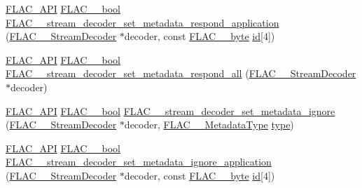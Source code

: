 \begin{DoxyCompactItemize}
\item 
\mbox{\hyperlink{group__flac__export_ga56ca07df8a23310707732b1c0007d6f5}{F\+L\+A\+C\+\_\+\+A\+PI}} \mbox{\hyperlink{ordinals_8h_a95103469f1cbd78b8cf250194985b34e}{F\+L\+A\+C\+\_\+\+\_\+bool}} \mbox{\hyperlink{group__flac__stream__decoder_gabf2a1e945eb2a158090665e03ff55ad2}{F\+L\+A\+C\+\_\+\+\_\+stream\+\_\+decoder\+\_\+set\+\_\+metadata\+\_\+respond\+\_\+application}} (\mbox{\hyperlink{struct_f_l_a_c_____stream_decoder}{F\+L\+A\+C\+\_\+\+\_\+\+Stream\+Decoder}} $\ast$decoder, const \mbox{\hyperlink{ordinals_8h_a5eb569b12d5b047cdacada4d57924ee3}{F\+L\+A\+C\+\_\+\+\_\+byte}} \mbox{\hyperlink{_s_d_l__opengl__glext_8h_a58c2a664503e14ffb8f21012aabff3e9}{id}}\mbox{[}4\mbox{]})
\item 
\mbox{\hyperlink{group__flac__export_ga56ca07df8a23310707732b1c0007d6f5}{F\+L\+A\+C\+\_\+\+A\+PI}} \mbox{\hyperlink{ordinals_8h_a95103469f1cbd78b8cf250194985b34e}{F\+L\+A\+C\+\_\+\+\_\+bool}} \mbox{\hyperlink{group__flac__stream__decoder_gaf3bec52172d727a4db8209b82db00c84}{F\+L\+A\+C\+\_\+\+\_\+stream\+\_\+decoder\+\_\+set\+\_\+metadata\+\_\+respond\+\_\+all}} (\mbox{\hyperlink{struct_f_l_a_c_____stream_decoder}{F\+L\+A\+C\+\_\+\+\_\+\+Stream\+Decoder}} $\ast$decoder)
\item 
\mbox{\hyperlink{group__flac__export_ga56ca07df8a23310707732b1c0007d6f5}{F\+L\+A\+C\+\_\+\+A\+PI}} \mbox{\hyperlink{ordinals_8h_a95103469f1cbd78b8cf250194985b34e}{F\+L\+A\+C\+\_\+\+\_\+bool}} \mbox{\hyperlink{group__flac__stream__decoder_ga0fb395d7c18c136d5a84869f6f2d736f}{F\+L\+A\+C\+\_\+\+\_\+stream\+\_\+decoder\+\_\+set\+\_\+metadata\+\_\+ignore}} (\mbox{\hyperlink{struct_f_l_a_c_____stream_decoder}{F\+L\+A\+C\+\_\+\+\_\+\+Stream\+Decoder}} $\ast$decoder, \mbox{\hyperlink{group__flac__format_gac71714ba8ddbbd66d26bb78a427fac01}{F\+L\+A\+C\+\_\+\+\_\+\+Metadata\+Type}} \mbox{\hyperlink{_s_d_l__opengl_8h_ad5ddf6fca7b585646515660e810e0188}{type}})
\item 
\mbox{\hyperlink{group__flac__export_ga56ca07df8a23310707732b1c0007d6f5}{F\+L\+A\+C\+\_\+\+A\+PI}} \mbox{\hyperlink{ordinals_8h_a95103469f1cbd78b8cf250194985b34e}{F\+L\+A\+C\+\_\+\+\_\+bool}} \mbox{\hyperlink{group__flac__stream__decoder_gac5eb8b3cb8df3afe788046317fbe9fb6}{F\+L\+A\+C\+\_\+\+\_\+stream\+\_\+decoder\+\_\+set\+\_\+metadata\+\_\+ignore\+\_\+application}} (\mbox{\hyperlink{struct_f_l_a_c_____stream_decoder}{F\+L\+A\+C\+\_\+\+\_\+\+Stream\+Decoder}} $\ast$decoder, const \mbox{\hyperlink{ordinals_8h_a5eb569b12d5b047cdacada4d57924ee3}{F\+L\+A\+C\+\_\+\+\_\+byte}} \mbox{\hyperlink{_s_d_l__opengl__glext_8h_a58c2a664503e14ffb8f21012aabff3e9}{id}}\mbox{[}4\mbox{]})

\end{DoxyCompactItemize}
